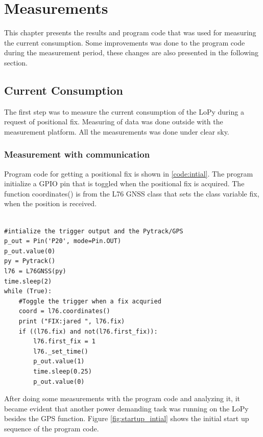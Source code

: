 \chapter{Measurements}

 This chapter presents the results and program code that was used for measuring the current consumption. Some improvements was done to the program code during the measurement period, these changes are also presented in the following section.






\section{Current Consumption}

The first step was to measure the current consumption of the LoPy during a request of positional fix. Measuring of data was done outside with the measurement platform. All the measurements was done under clear sky. 


\subsection{Measurement with communication}
Program code for getting a positional fix is shown in \ref{code:intial}. The program initialize a GPIO pin that is toggled when the positional fix is acquired. The function coordinates() is from the L76 GNSS class that sets the class variable fix, when the position is received. 
\lstset{language=Python}          %
\begin{lstlisting}[frame=single]  % Start your code-block

#intialize the trigger output and the Pytrack/GPS
p_out = Pin('P20', mode=Pin.OUT)
p_out.value(0)
py = Pytrack()
l76 = L76GNSS(py)
time.sleep(2)
while (True):
    #Toggle the trigger when a fix acquried
    coord = l76.coordinates()
    print ("FIX:jared ", l76.fix)
    if ((l76.fix) and not(l76.first_fix)):
        l76.first_fix = 1
        l76._set_time()
        p_out.value(1)
        time.sleep(0.25)
        p_out.value(0)
\end{lstlisting}
\label{code:intial}


After doing some measurements with the program code and analyzing it, it became evident that another power demanding task was running on the LoPy besides the GPS function.  Figure \ref{fig:startup_intial} shows the initial start up sequence of the program code.

